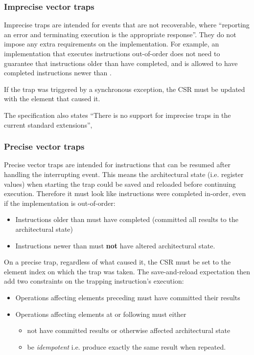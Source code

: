 \subsubsection{Imprecise vector traps}
Imprecise traps are intended for events that are not recoverable, where \enquote{reporting an error and terminating execution is the appropriate response}.
They do not impose any extra requirements on the implementation.
For example, an implementation that executes instructions out-of-order does not need to guarantee that instructions older than  have completed, and is allowed to have completed instructions newer than .

If the trap was triggered by a synchronous exception, the  CSR must be updated with the element that caused it.

The specification also states \enquote{There is no support for imprecise traps in the current standard extensions}, 

\subsubsection{Precise vector traps}
Precise vector traps are intended for instructions that can be resumed after handling the interrupting event.
This means the architectural state (i.e. register values) when starting the trap could be saved and reloaded before continuing execution.
Therefore it must look like instructions were completed in-order, even if the implementation is out-of-order:
\begin{itemize}
    \item Instructions older than  must have completed (committed all results to the architectural state)
    \item Instructions newer than  must \textbf{not} have altered architectural state.
\end{itemize}

On a precise trap, regardless of what caused it, the  CSR must be set to the element index on which the trap was taken.
The save-and-reload expectation then add two constraints on the trapping instruction's execution:
\begin{itemize}
    \item Operations affecting elements preceding  must have committed their results
    \item Operations affecting elements at or following  must either
    \begin{itemize}
        \item not have committed results or otherwise affected architectural state
        \item be \emph{idempotent} i.e. produce exactly the same result when repeated.
    \end{itemize}
\end{itemize}

